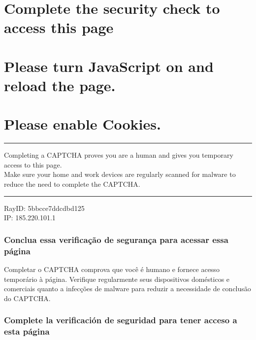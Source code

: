\hypertarget{complete-the-security-check-to-access-this-page}{%
\section{Complete the security check to access this
page}\label{complete-the-security-check-to-access-this-page}}

\hypertarget{please-turn-javascript-on-and-reload-the-page}{%
\section{Please turn JavaScript on and reload the
page.}\label{please-turn-javascript-on-and-reload-the-page}}

\hypertarget{please-enable-cookies}{%
\section{Please enable Cookies.}\label{please-enable-cookies}}

\begin{center}\rule{0.5\linewidth}{\linethickness}\end{center}

Completing a CAPTCHA proves you are a human and gives you temporary
access to this page.\\
Make sure your home and work devices are regularly scanned for malware
to reduce the need to complete the CAPTCHA.

\begin{center}\rule{0.5\linewidth}{\linethickness}\end{center}

RayID: 5bbcce7ddcdbd125\\
IP: 185.220.101.1

\hypertarget{conclua-essa-verificauxe7uxe3o-de-seguranuxe7a-para-acessar-essa-puxe1gina}{%
\subsubsection{Conclua essa verificação de segurança para acessar essa
página}\label{conclua-essa-verificauxe7uxe3o-de-seguranuxe7a-para-acessar-essa-puxe1gina}}

Completar o CAPTCHA comprova que você é humano e fornece acesso
temporário à página. Verifique regularmente seus dispositivos domésticos
e comerciais quanto a infecções de malware para reduzir a necessidade de
conclusão do CAPTCHA.

\hypertarget{complete-la-verificaciuxf3n-de-seguridad-para-tener-acceso-a-esta-puxe1gina}{%
\subsubsection{Complete la verificación de seguridad para tener acceso a
esta
página}\label{complete-la-verificaciuxf3n-de-seguridad-para-tener-acceso-a-esta-puxe1gina}}

